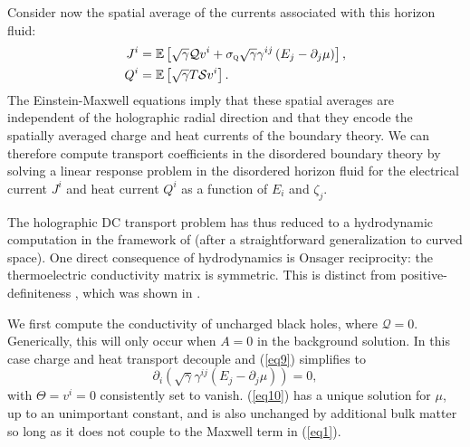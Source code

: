 \documentclass[10pt, oneside]{book}
\begin{document}
\begin{doublespace}
Consider now the spatial average of the currents associated with this horizon fluid:
\begin{subequations}\begin{align}
J^i  &= \mathbb{E}\left[\sqrt{\gamma}\mathcal{Q}v^i + \sigma_{\textsc{q}}\sqrt{\gamma}\gamma^{ij}\left(E_j - \partial_j  \mu\right)\right], \label{jhor} \\
 Q^i &= \mathbb{E}\left[\sqrt{\gamma}T\mathcal{S} v^i\right].
\end{align}\end{subequations} 
The Einstein-Maxwell equations imply that these spatial averages are independent of the holographic radial direction and that they encode the   spatially averaged charge and heat currents of the boundary theory.
We can therefore compute transport coefficients in the disordered boundary theory by solving a linear response problem in the disordered horizon fluid for the electrical current $J^i$ and heat current $Q^i$ as a function of $E_i$ and $\zeta_j$.  %

The holographic DC transport problem has thus reduced to a hydrodynamic computation in the framework of \cite{Lucas:2015lna} (after a straightforward generalization to curved space).   One direct consequence of hydrodynamics is Onsager reciprocity:  the  %
thermoelectric conductivity matrix is symmetric.  This is distinct from positive-definiteness%
, which was shown in \cite{Donos:2015gia}.

We first compute the conductivity of uncharged black holes, where $\mathcal{Q}=0$. %
Generically, this will only occur when $A=0$ in the background solution.     In this case charge and heat transport decouple and (\ref{eq9}) simplifies to \begin{equation}
\partial_i \left(\sqrt{\gamma}\gamma^{ij}\left(E_j - \partial_j  \mu\right)\right) = 0, \label{eq10}
\end{equation}
with $\Theta=v^i=0$ consistently set to vanish.   (\ref{eq10}) has a unique solution for $\mu$, up to an unimportant constant, and is also unchanged by additional bulk matter so long as it does not couple to the Maxwell term in (\ref{eq1}).


\end{doublespace}
\end{document}
